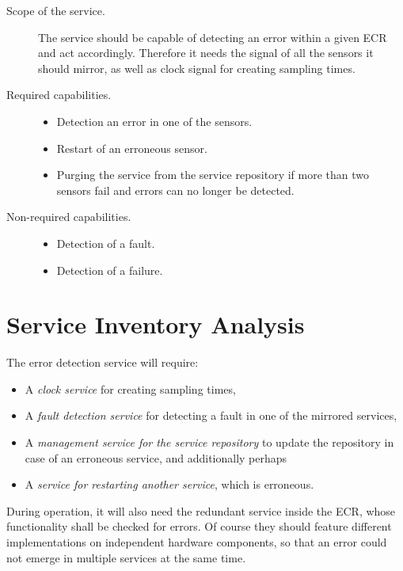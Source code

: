 \begin{description}
\item [Scope of the service.]
The service should be capable of detecting an error within a given ECR and act accordingly. Therefore it needs the signal of all the sensors it should mirror, as well as clock signal for creating sampling times.
\item [Required capabilities.]
	\begin{itemize}
	\item Detection an error in one of the sensors.
	\item Restart of an erroneous sensor.
	\item Purging the service from the service repository if more than two sensors fail and errors can no longer be detected.
	\end{itemize}
\item [Non-required capabilities.]
	\begin{itemize}
	\item Detection of a fault.
	\item Detection of a failure.
	\end{itemize}
\end{description}



\section{Service Inventory Analysis}


The error detection service will require:
\begin{itemize}
\item A \emph{clock service} for creating sampling times,
\item A \emph{fault detection service} for detecting a fault in one of the mirrored services,
\item A \emph{management service for the service repository} to update the repository in case of an erroneous service, and additionally perhaps
\item A \emph{service for restarting another service}, which is erroneous.
\end{itemize}

During operation, it will also need the redundant service inside the ECR, whose functionality shall be checked for errors. Of course they should feature different implementations on independent hardware components, so that an error could not emerge in multiple services at the same time.



